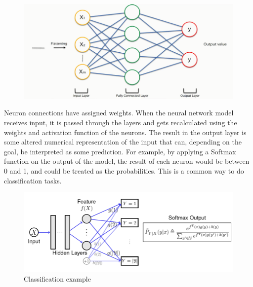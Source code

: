 \begin{figure}[H]
    \centering
    \includegraphics[scale=0.9]{figures/ffcexample}
    \label{Simple neural network example}
\end{figure}

Neuron connections have assigned weights. When the neural network model receives input, it is passed through the layers and gets recalculated using the weights and activation function of the neurons. The result in the output layer is some altered numerical representation of the input that can, depending on the goal, be interpreted as some prediction. For example, by applying a Softmax function on the output of the model, the result of each neuron would be between 0 and 1, and could be treated as the probabilities. This is a common way to do classification tasks. 

\begin{figure}[H]
    \centering
    \includegraphics[scale=0.6]{figures/classificationExample}
    \caption{Classification example}
    \label{Classification example}
\end{figure}

